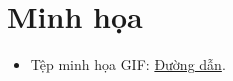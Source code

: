 \documentclass[10pt]{report}
\begin{document}
\chapter{Minh họa}
\begin{itemize}
	\item Tệp minh họa GIF: \href{https://drive.google.com/drive/folders/1Y9O6Grwpr5_lXe6NCfDQ9JAiGZB6AJpM?usp=sharing}{Đường dẫn}.
\end{itemize}
\end{document}

